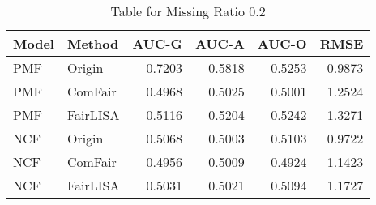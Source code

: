 \begin{table}
\centering
\caption{Table for Missing Ratio 0.2}
\label{tab:missing_0.2}
\begin{tabular}{llrrrr}
\toprule
Model &   Method &  AUC-G &  AUC-A &  AUC-O &   RMSE \\
\midrule
  PMF &   Origin & 0.7203 & 0.5818 & 0.5253 & 0.9873 \\
  PMF &  ComFair & 0.4968 & 0.5025 & 0.5001 & 1.2524 \\
  PMF & FairLISA & 0.5116 & 0.5204 & 0.5242 & 1.3271 \\
  NCF &   Origin & 0.5068 & 0.5003 & 0.5103 & 0.9722 \\
  NCF &  ComFair & 0.4956 & 0.5009 & 0.4924 & 1.1423 \\
  NCF & FairLISA & 0.5031 & 0.5021 & 0.5094 & 1.1727 \\
\bottomrule
\end{tabular}
\end{table}
